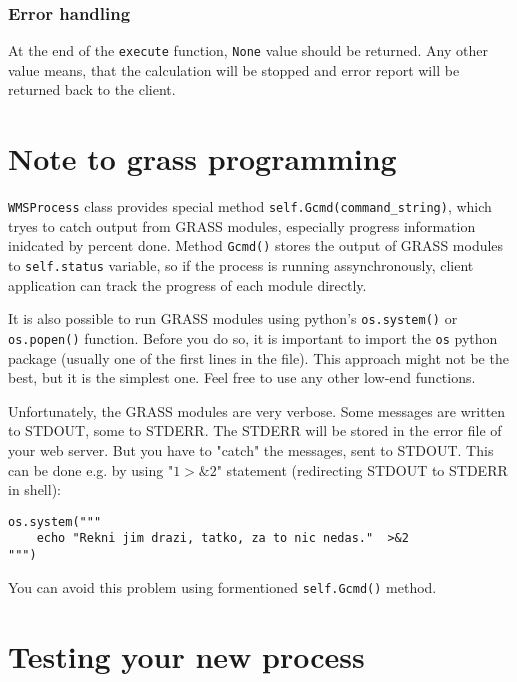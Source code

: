 \documentclass[a4paper,11pt]{article}
\begin{document}
\subsubsection{Error handling}
    
At the end of the \texttt{execute} function, \texttt{None} value should be returned. Any other 
value means, that the calculation will be stopped and error report will be returned back to the client.
    


\section{Note to grass programming}
    
\texttt{WMSProcess} class provides special method
\texttt{self.Gcmd(command\_string)}, which tryes to catch output from GRASS
modules, especially progress information inidcated by percent done. Method
\texttt{Gcmd()} stores the output of GRASS modules to \texttt{self.status}
variable, so if the process is running assynchronously, client application
can track the progress of each module directly.

It is also possible to run GRASS modules using python's
\texttt{os.system()} or \texttt{os.popen()} function.  Before you do so, it
is important to import the \texttt{os} python package (usually one of the
first lines in the file). This approach might not be the best, but it is
the simplest one. Feel free to use any other low-end functions.
    
    
Unfortunately, the GRASS modules are very verbose. Some messages are
written to STDOUT, some to STDERR. The STDERR will be stored in the error
file of your web server. But you have to "catch" the messages, sent to
STDOUT. This can be done e.g. by using "$1>\&2$" statement (redirecting
STDOUT to STDERR in shell):

\begin{verbatim}
os.system("""
    echo "Rekni jim drazi, tatko, za to nic nedas."  >&2
""")
\end{verbatim}

You can avoid this problem using formentioned \texttt{self.Gcmd()} method.

\section{Testing your new process}
\end{document}
